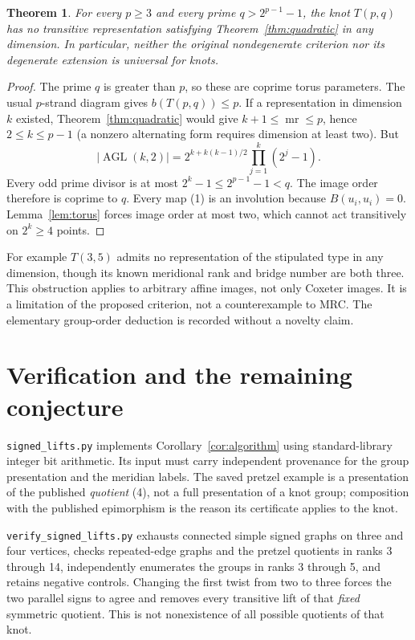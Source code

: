 \documentclass[11pt]{article}
\newtheorem{theorem}{Theorem}
\newcommand{\mr}{\operatorname{mr}}
\begin{document}
\begin{theorem}\label{thm:nouniversal}
For every $p\ge3$ and every prime $q>2^{p-1}-1$, the knot $T(p,q)$
has no transitive representation satisfying Theorem~\ref{thm:quadratic}
in any dimension. In particular, neither the original nondegenerate
criterion nor its degenerate extension is universal for knots.
\end{theorem}
\begin{proof}
The prime $q$ is greater than $p$, so these are coprime torus parameters.
The usual $p$-strand diagram gives $b(T(p,q))\le p$. If a representation
in dimension $k$ existed, Theorem~\ref{thm:quadratic} would give
$k+1\le\mr\le p$, hence $2\le k\le p-1$ (a nonzero alternating form
requires dimension at least two). But
\[
 |\operatorname{AGL}(k,2)|
   =2^{k+k(k-1)/2}\prod_{j=1}^{k}(2^j-1).
\]
Every odd prime divisor is at most $2^k-1\le2^{p-1}-1<q$.
The image order therefore is coprime to $q$.
Every map (1) is an involution because $B(u_i,u_i)=0$.
Lemma~\ref{lem:torus} forces image order at most two, which cannot
act transitively on $2^k\ge4$ points.
\end{proof}

For example $T(3,5)$ admits no representation of the stipulated type
in any dimension, though its known meridional rank and bridge number
are both three. This obstruction applies to arbitrary affine images,
not only Coxeter images. It is a limitation of the proposed criterion,
not a counterexample to MRC. The elementary group-order deduction is
recorded without a novelty claim.

\section{Verification and the remaining conjecture}

\texttt{signed\_lifts.py} implements Corollary~\ref{cor:algorithm} using
standard-library integer bit arithmetic. Its input must carry independent
provenance for the group presentation and the meridian labels. The saved
pretzel example is a presentation of the published \emph{quotient} (4),
not a full presentation of a knot group; composition with the published
epimorphism is the reason its certificate applies to the knot.

\texttt{verify\_signed\_lifts.py} exhausts connected simple signed graphs
on three and four vertices, checks repeated-edge graphs and the pretzel
quotients in ranks 3 through 14, independently enumerates the groups in
ranks 3 through 5, and retains negative controls. Changing the first
twist from two to three forces the two parallel signs to agree and
removes every transitive lift of that \emph{fixed} symmetric quotient.
This is not nonexistence of all possible quotients of that knot.
\end{document}

